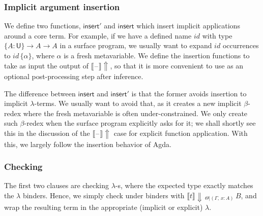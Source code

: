 \documentclass[acmsmall,review,anonymous,prologue,dvipsnames]{acmart}\settopmatter{printfolios=true,printccs=false,printacmref=false}
\renewcommand{\U}{\mathsf{U}}
\newcommand{\blank}{\mathord{\hspace{1pt}\text{--}\hspace{1pt}}}
\newcommand{\einferblank}{\llbracket\blank\rrbracket\!\Uparrow}
\newcommand{\echeck}[4]{\llbracket#1\rrbracket\!\Downarrow\,_{#2|#3}\,#4}
\newcommand{\einsert}{\mathsf{insert}}
\theoremstyle{remark}
\begin{document}
\subsubsection{Implicit argument insertion}
We define two functions, $\einsert'$ and $\einsert$ which insert implicit
applications around a core term. For example, if we have a defined name $id$
with type $\{A : \U\}\to A \to A$ in a surface program, we usually want to
expand $id$ occurrences to $id\,\{\alpha\}$, where $\alpha$ is a fresh
metavariable. We define the insertion functions to take as input the output of
$\einferblank$, so that it is more convenient to use as an optional
post-processing step after inference.

The difference between $\einsert$ and $\einsert'$ is that the former avoids
insertion to implicit $\lambda$-terms. We usually want to avoid that, as it
creates a new implicit $\beta$-redex where the fresh metavariable is often
under-constrained. We only create such $\beta$-redex when the surface program
explicitly asks for it; we shall shortly see this in the discussion of the
$\einferblank$ case for explicit function application. With this, we largely
follow the insertion behavior of Agda.

\subsubsection{Checking}
The first two clauses are checking $\lambda$-s, where the expected type exactly
matches the $\lambda$ binders. Hence, we simply check under binders with
$\echeck{t}{\Theta}{(\Gamma,\,x:A)} B$, and wrap the resulting term in the
appropriate (implicit or explicit) $\lambda$.
\end{document}
